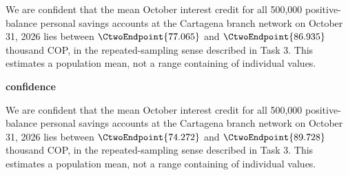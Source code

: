 We are  confident that the mean October interest credit for all 500,000 positive-balance personal savings accounts at the Cartagena branch network on October 31, 2026 lies between $\CtwoEndpoint{77.065}$ and $\CtwoEndpoint{86.935}$ thousand COP, in the repeated-sampling sense described in Task 3. This estimates a population mean, not a range containing  of individual values.

\textbf{ confidence}




We are  confident that the mean October interest credit for all 500,000 positive-balance personal savings accounts at the Cartagena branch network on October 31, 2026 lies between $\CtwoEndpoint{74.272}$ and $\CtwoEndpoint{89.728}$ thousand COP, in the repeated-sampling sense described in Task 3. This estimates a population mean, not a range containing  of individual values.

